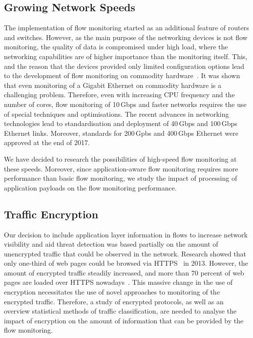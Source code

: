 \subsection{Growing Network Speeds}

The implementation of flow monitoring started as an additional feature of routers and switches. However, as the main purpose of the networking devices is not flow monitoring, the quality of data is compromised under high load, where the networking capabilities are of higher importance than the monitoring itself. This, and the reason that the devices provided only limited configuration options lead to the development of flow monitoring on commodity hardware~\cite{Deri-2003-Passively}. It was shown that even monitoring of a Gigabit Ethernet on commodity hardware is a challenging problem. Therefore, even with increasing CPU frequency and the number of cores, flow monitoring of 10\,Gbps and faster networks requires the use of special techniques and optimisations. The recent advances in networking technologies lead to standardisation and deployment of 40\,Gbps and 100\,Gbps Ethernet links. Moreover, standards for 200\,Gpbs and 400\,Gbps Ethernet were approved at the end of 2017.

We have decided to research the possibilities of high-speed flow monitoring at these speeds. Moreover, since application-aware flow monitoring requires more performance than basic flow monitoring, we study the impact of processing of application payloads on the flow monitoring performance.
\subsection{Traffic Encryption}

Our decision to include application layer information in flows to increase network visibility and aid threat detection was based partially on the amount of unencrypted traffic that could be observed in the network. Research showed that only one-third of web pages could be browsed via HTTPS~\cite{Vratonjic-2013-Inconvenient} in 2013. However, the amount of encrypted traffic steadily increased, and more than 70 percent of web pages are loaded over HTTPS nowadays~\cite{ISRG-2018-Lets}. This massive change in the use of encryption necessitates the use of novel approaches to monitoring of the encrypted traffic. Therefore, a study of encrypted protocols, as well as an overview statistical methods of traffic classification, are needed to analyse the impact of encryption on the amount of information that can be provided by the flow monitoring.

